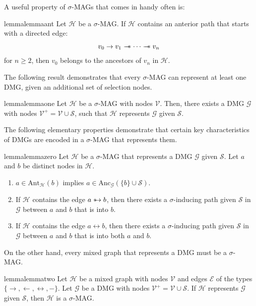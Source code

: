 \documentclass[accepted]{uai2025} %
\newcommand{\anc}{\text{Anc}}
\newcommand{\ant}{\text{Ant}}
\newcommand{\huh}{\mathrel{\leftrightarrow}}
\newcommand{\suh}{\mathrel{{\ast\mkern-11mu\to}}}
\newcommand{\tus}{\mathrel{{\relbar\mkern-11mu\relbar\mkern-11mu\ast}}}
\begin{document}
A useful property of $\sigma$-MAGs that comes in handy often is:
\begin{restatable}{lemma}{lemmaant} \label{lemmaant}
Let $\mathcal{H}$ be a $\sigma$-MAG. If $\mathcal{H}$ contains an anterior path that starts with a directed edge:
\[
v_0 \rightarrow v_1 \tus  \cdots \tus  v_n
\]
for $n\geq2$, then $v_0$ belongs to the ancestors of $v_n$ in $\mathcal{H}$.
\end{restatable}

The following result demonstrates that every $\sigma$-MAG can represent at least one DMG, given an additional set of selection nodes.

\begin{restatable}{lemma}{lemmaone} \label{lemma1}
Let \(\mathcal{H}\) be a \(\sigma\)-MAG with nodes \( \mathcal{V} \). Then, there exists a DMG \( \mathcal{G} \) with nodes \( \mathcal{V}^+ = \mathcal{V} \cup \mathcal{S} \), such that \(\mathcal{H}\) represents \( \mathcal{G} \) given \( \mathcal{S} \).
\end{restatable}

The following elementary properties demonstrate that certain key characteristics of DMGs are encoded in a $\sigma$-MAG that represents them.

\begin{restatable}{lemma}{lemmazero} \label{lemma0}
Let $\mathcal{H}$ be a $\sigma$-MAG that represents a DMG $\mathcal{G}$ given $\mathcal{S}$. Let $a$ and $b$ be distinct nodes in $\mathcal{H}$.
\begin{enumerate}
    \item $a\in\ant_\mathcal{H}(b)$ implies $a\in\anc_\mathcal{G}(\{b\}\cup \mathcal{S})$.
    \item If $\mathcal{H}$ contains the edge $a \suh b$, then there exists a $\sigma$-inducing path given $\mathcal{S}$ in $\mathcal{G}$ between $a$ and $b$ that is into $b$.
    \item If $\mathcal{H}$ contains the edge $a \huh b$, then there exists a $\sigma$-inducing path given $\mathcal{S}$ in $\mathcal{G}$ between $a$ and $b$ that is into both $a$ and $b$.
\end{enumerate}
\end{restatable}

On the other hand, every mixed graph that represents a DMG must be a $\sigma$-MAG.

\begin{restatable}{lemma}{lemmatwo} \label{lemma2}
Let $\mathcal{H}$ be a mixed graph with nodes $ \mathcal{V} $ and edges \(\mathcal{E}\) of the types \(\{\rightarrow, \leftarrow, \huh , -\}\). Let $\mathcal{G}$ be a DMG with nodes $\mathcal{V}^+ = \mathcal{V} \cup \mathcal{S}$. If $\mathcal{H}$ represents $\mathcal{G}$ given $\mathcal{S}$, then $\mathcal{H}$ is a $\sigma$-MAG.
\end{restatable} 
\end{document}

